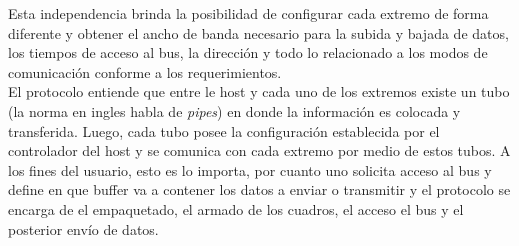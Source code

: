 	Esta independencia brinda la posibilidad de configurar cada extremo de forma diferente y obtener el ancho de banda necesario para la subida y bajada de datos, los tiempos de acceso al bus, la dirección y todo lo relacionado a los modos de comunicación conforme a los requerimientos.\\
	
	El protocolo entiende que entre le host y cada uno de los extremos existe un tubo (la norma en ingles habla de {\it pipes}) en donde la información es colocada y transferida. Luego, cada tubo posee la configuración establecida por el controlador del host y se comunica con cada extremo por medio de estos tubos. A los fines del usuario, esto es lo importa, por cuanto uno solicita acceso al bus y define en que buffer va a contener los datos a enviar o transmitir y el protocolo se encarga de el empaquetado, el armado de los cuadros, el acceso el bus y el posterior envío de datos.\\
